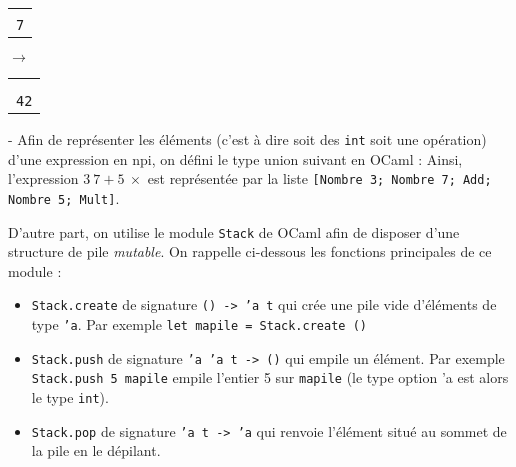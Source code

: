 \documentclass[11pt,a4paper]{article}
\begin{document}
\begin{Exercise}[title = {Piles et notation polonaise inverse}]
{\begin{tabular}{|>{\centering\arraybackslash}p{1cm}|}
			\hline
			{\tt }   \\
			\hline
			{\tt 6}   \\
			\hline
			{\tt 7} \\
			\hline
		\end{tabular}        $\longrightarrow $ 
        \begin{tabular}{|>{\centering\arraybackslash}p{1cm}|}
			\hline
			{\tt }   \\
			\hline
			{\tt }   \\
			\hline
			{\tt }   \\
			\hline
			{\tt 42} \\
			\hline
		\end{tabular}
        }
	\leftskip -\QuestionIndent
	\smallskip
	Afin de représenter les éléments (c'est à dire soit des {\tt int} soit une opération) d'une expression en {\sc npi}, on défini le type union suivant en OCaml :
	Ainsi, l'expression $3\ 7 + 5\ \times$ est représentée par la liste {\tt [Nombre 3; Nombre 7; Add; Nombre 5; Mult]}.

	\smallskip
	D'autre part, on utilise le module {\tt Stack} de OCaml afin de disposer d'une structure de pile \textit{mutable}. On rappelle ci-dessous les fonctions principales de ce module :
	\begin{itemize}
		\item \texttt{Stack.create} de signature {\tt () -> 'a t} qui crée une pile vide d'éléments de type {\tt 'a}. Par exemple \texttt{let mapile = Stack.create ()}
		\item \texttt{Stack.push} de signature {\tt 'a 'a t -> ()} qui empile un élément. Par exemple \texttt{Stack.push 5 mapile} empile l'entier 5 sur {\tt mapile} (le type option 'a est alors le type {\tt int}).
		\item \texttt{Stack.pop} de signature {\tt 'a t -> 'a} qui renvoie l'élément situé au sommet de la pile en le dépilant.
	\end{itemize}

	\leftskip 0pt
\end{Exercise}
\end{document}
